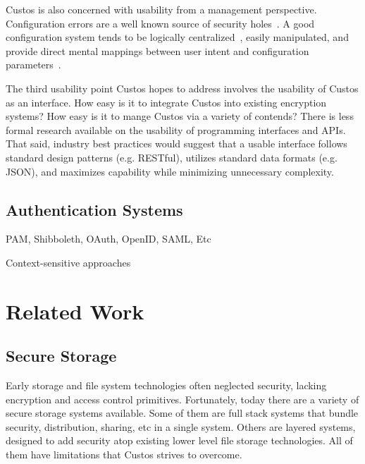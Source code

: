 Custos is also concerned with usability from a management
perspective. Configuration errors are a well known source of security
holes~\cite{Bishop1996, kerravala2002configuration}. A good
configuration system tends to be logically
centralized~\cite{Casado2007}, easily manipulated, and provide direct
mental mappings between user intent and configuration
parameters~\cite{norman2002design}.

The third usability point Custos hopes to address involves the
usability of Custos as an interface. How easy is it to integrate
Custos into existing encryption systems? How easy is it to mange
Custos via a variety of contends? There is less formal research
available on the usability of programming interfaces and APIs. That
said, industry best practices would suggest that a usable interface
follows standard design patterns (e.g. RESTful), utilizes standard
data formats (e.g. JSON), and maximizes capability while minimizing
unnecessary complexity.

\subsection{Authentication Systems}

PAM, Shibboleth, OAuth, OpenID, SAML, Etc

Context-sensitive approaches

\section{Related Work}

\subsection{Secure Storage}

Early storage and file system technologies often neglected security,
lacking encryption and access control primitives. Fortunately, today
there are a variety of secure storage systems available. Some of them
are full stack systems that bundle security, distribution, sharing,
etc in a single system. Others are layered systems, designed to add
security atop existing lower level file storage technologies. All of
them have limitations that Custos strives to overcome.


